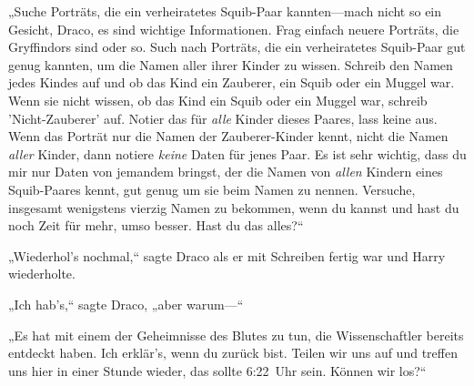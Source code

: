 „Suche Porträts, die ein verheiratetes Squib-Paar kannten—mach nicht so ein Gesicht, Draco, es sind wichtige Informationen. Frag einfach neuere Porträts, die Gryffindors sind oder so. Such nach Porträts, die ein verheiratetes Squib-Paar gut genug kannten, um die Namen aller ihrer Kinder zu wissen. Schreib den Namen jedes Kindes auf und ob das Kind ein Zauberer, ein Squib oder ein Muggel war. Wenn sie nicht wissen, ob das Kind ein Squib oder ein Muggel war, schreib 'Nicht-Zauberer' auf. Notier das für \emph{alle} Kinder dieses Paares, lass keine aus. Wenn das Porträt nur die Namen der Zauberer-Kinder kennt, nicht die Namen \emph{aller} Kinder, dann notiere \emph{keine} Daten für jenes Paar. Es ist sehr wichtig, dass du mir nur Daten von jemandem bringst, der die Namen von \emph{allen} Kindern eines Squib-Paares kennt, gut genug um sie beim Namen zu nennen. Versuche, insgesamt wenigstens vierzig Namen zu bekommen, wenn du kannst und hast du noch Zeit für mehr, umso besser. Hast du das alles?“

„Wiederhol's nochmal,“ sagte Draco als er mit Schreiben fertig war und Harry wiederholte.

„Ich hab's,“ sagte Draco, „aber warum—“

„Es hat mit einem der Geheimnisse des Blutes zu tun, die Wissenschaftler bereits entdeckt haben. Ich erklär's, wenn du zurück bist. Teilen wir uns auf und treffen uns hier in einer Stunde wieder, das sollte 6:22~Uhr sein. Können wir los?“

